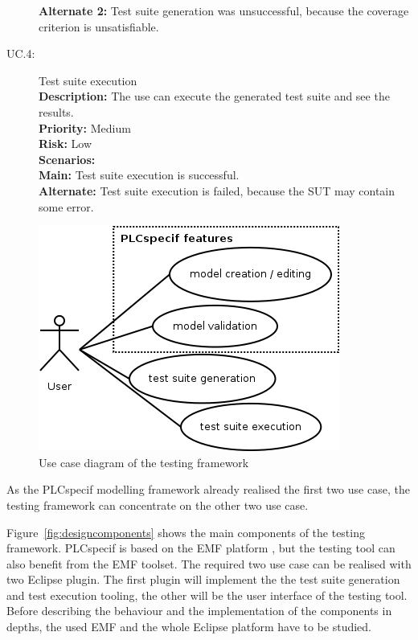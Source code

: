 \begin{description}
			\-\hspace{0,5cm}\textbf{Alternate 2:} Test suite generation was unsuccessful, because the coverage criterion is unsatisfiable.
	\item[UC.4:] Test suite execution\\
		\textbf{Description:} The use can execute the generated test suite and see the results.\\
		\textbf{Priority:} Medium\\
		\textbf{Risk:} Low\\
		\textbf{Scenarios:}\\
			\-\hspace{0,5cm}\textbf{Main:} Test suite execution is successful.\\
			\-\hspace{0,5cm}\textbf{Alternate:} Test suite execution is failed, because the SUT may contain some error.
\end{description}

\begin{figure}[htp]
\centering
\includegraphics[scale=0.6]{figures/design_uc.png}
\caption{Use case diagram of the testing framework}
\label{fig:designuc}
\end{figure}

As the PLCspecif modelling framework already realised the first two use case, the testing framework can concentrate on the other two use case.

Figure~\ref{fig:designcomponents} shows the main components of the testing framework. PLCspecif is based on the EMF platform \cite{emf}\cite{emfbook}, but the testing tool can also benefit from the EMF toolset. The required two use case can be realised with two Eclipse plugin. The first plugin will implement the the test suite generation and test execution tooling, the other will be the user interface of the testing tool. Before describing the behaviour and the implementation of the components in depths, the used EMF and the whole Eclipse platform have to be studied.

